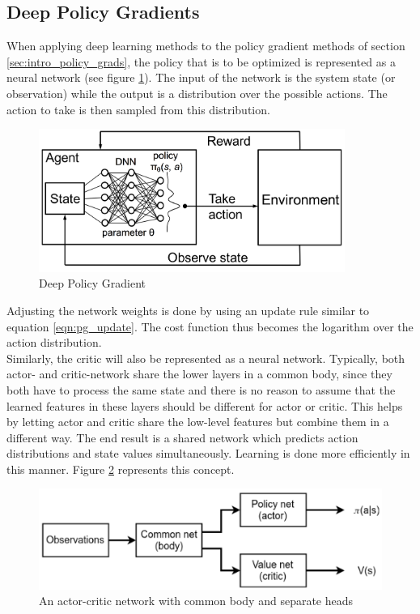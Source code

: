 \subsection{Deep Policy Gradients}
\label{sec:deep_pg}
When applying deep learning methods to the policy gradient methods of section \ref{sec:intro_policy_grads}, the policy that is to be optimized is represented as a neural network (see figure \ref{fig:deep_pg}). The input of the network is the system state (or observation) while the output is a distribution over the possible actions. The action to take is then sampled from this distribution.
\begin{figure}[htp]
    \centering
    \includegraphics[width=10cm]{images/deep_pg.png}
    \caption{Deep Policy Gradient}
    \label{fig:deep_pg}
\end{figure}
Adjusting the network weights is done by using an update rule similar to equation \ref{eqn:pg_update}. The cost function thus becomes the logarithm over the action distribution.\\

Similarly, the critic will also be represented as a neural network. Typically, both actor- and critic-network share the lower layers in a common body, since they both have to process the same state and there is no reason to assume that the learned features in these layers should be different for actor or critic. This helps by letting actor and critic share the low-level features but combine them in a different way. The end result is a shared network which predicts action distributions and state values simultaneously. Learning is done more efficiently in this manner. Figure \ref{fig:common_body} represents this concept.

\begin{figure}[htp]
    \centering
    \includegraphics[width=12cm]{images/common_body.png}
    \caption{An actor-critic network with common body and separate heads}
    \label{fig:common_body}
\end{figure}

